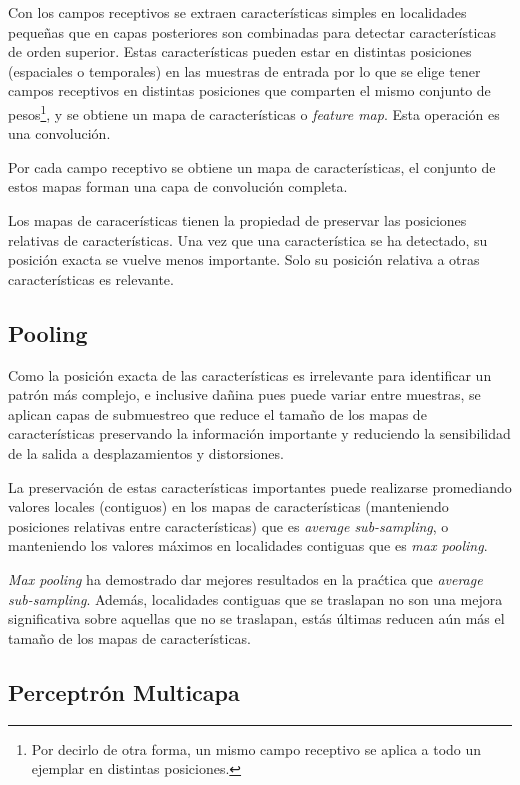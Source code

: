 \documentclass[spanish,11pt,letterpaper]{article}
\begin{document}
Con los campos receptivos se extraen características simples en localidades
pequeñas que en capas posteriores
son combinadas para detectar características de orden superior. Estas características
pueden estar en distintas posiciones (espaciales o temporales) en las muestras
de entrada por lo que se elige tener campos receptivos en distintas posiciones
que comparten el mismo conjunto de pesos\footnote{Por decirlo de otra forma, un
mismo campo receptivo se aplica a todo un ejemplar en distintas posiciones.}, y
se obtiene un mapa de características o \textit{feature map}. Esta operación es
una convolución.

Por cada campo receptivo se obtiene un mapa de características, el conjunto de
estos mapas forman una capa de convolución completa.

Los mapas de caracerísticas tienen la propiedad de preservar las posiciones
relativas de características. Una vez que una característica se ha detectado,
su posición exacta se vuelve menos importante. Solo su posición relativa a otras
características es relevante.

\subsection{Pooling}

Como la posición exacta de las características es irrelevante para identificar
un patrón más complejo, e inclusive dañina pues puede variar entre muestras, se
aplican capas de submuestreo que reduce el tamaño de los mapas de características
preservando la información importante y reduciendo la sensibilidad de la salida
a desplazamientos y distorsiones.

La preservación de estas características importantes puede realizarse promediando
valores locales (contiguos) en los mapas de características (manteniendo posiciones
relativas entre características) que es \textit{average sub-sampling}, o manteniendo
los valores máximos en localidades contiguas que es \textit{max pooling}.

\textit{Max pooling} ha demostrado dar mejores resultados en la praćtica que
\textit{average sub-sampling}\cite{pooling}. Además, localidades contiguas que se traslapan
no son una mejora significativa sobre aquellas que no se traslapan, estás
últimas reducen aún más el tamaño de los mapas de características.

\subsection{Perceptrón Multicapa}
\end{document}
